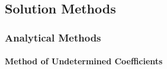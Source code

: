 
\subsection{Solution Methods}

\subsubsection{Analytical Methods}


\paragraph{Method of Undetermined Coefficients}


